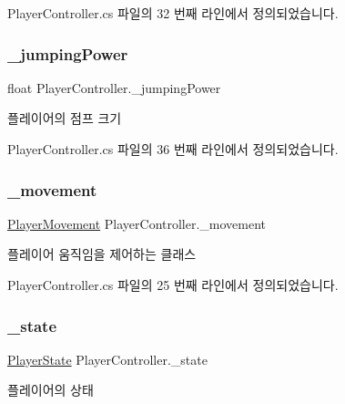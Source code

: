 Player\+Controller.\+cs 파일의 32 번째 라인에서 정의되었습니다.

\mbox{\label{class_player_controller_ad5b01cf8e0c714d76cbd667d4fab7c25}} 
\subsubsection{\texorpdfstring{\_jumpingPower}{\_jumpingPower}}
{\footnotesize\ttfamily float Player\+Controller.\+\_\+jumping\+Power}



플레이어의 점프 크기 



Player\+Controller.\+cs 파일의 36 번째 라인에서 정의되었습니다.

\mbox{\label{class_player_controller_ad788cfe2e37318d22d52010dc0fecd57}} 
\subsubsection{\texorpdfstring{\_movement}{\_movement}}
{\footnotesize\ttfamily \mbox{\hyperlink{class_player_movement}{Player\+Movement}} Player\+Controller.\+\_\+movement}



플레이어 움직임을 제어하는 클래스 



Player\+Controller.\+cs 파일의 25 번째 라인에서 정의되었습니다.

\mbox{\label{class_player_controller_addcd33a9c23c1b949964365390c7a6eb}} 
\subsubsection{\texorpdfstring{\_state}{\_state}}
{\footnotesize\ttfamily \mbox{\hyperlink{class_player_state}{Player\+State}} Player\+Controller.\+\_\+state}



플레이어의 상태 



